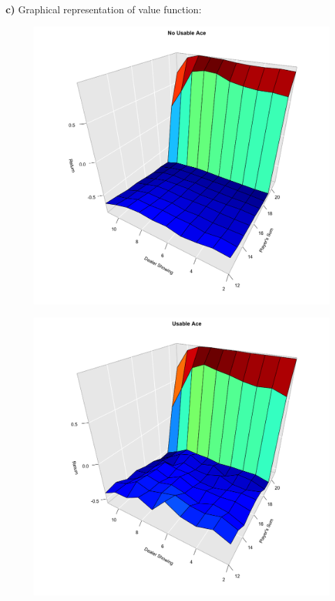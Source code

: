 \documentclass[a4paper,12pt]{article}
\begin{document}
\textbf{c)} Graphical representation of value function:

\begin{figure}[H]
  \centering
  \includegraphics[width=12cm]{figures/q3-1.png}
\end{figure}

\begin{figure}[H]
  \centering
  \includegraphics[width=12cm]{figures/q3-2.png}
\end{figure}
\end{document}
